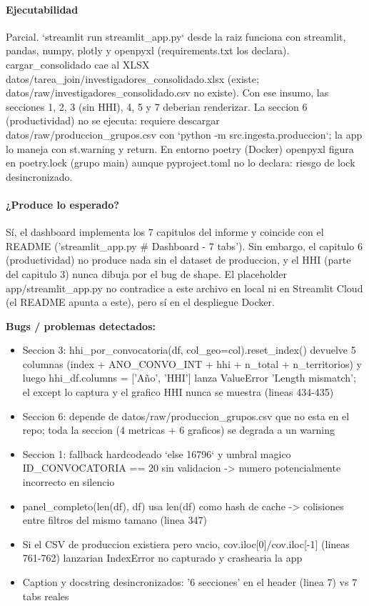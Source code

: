\paragraph{Ejecutabilidad}
Parcial. `streamlit run streamlit\_app.py` desde la raiz funciona con streamlit, pandas, numpy, plotly y openpyxl (requirements.txt los declara). cargar\_consolidado cae al XLSX datos/tarea\_join/investigadores\_consolidado.xlsx (existe; datos/raw/investigadores\_consolidado.csv no existe). Con ese insumo, las secciones 1, 2, 3 (sin HHI), 4, 5 y 7 deberian renderizar. La seccion 6 (productividad) no se ejecuta: requiere descargar datos/raw/produccion\_grupos.csv con `python -m src.ingesta.produccion`; la app lo maneja con st.warning y return. En entorno poetry (Docker) openpyxl figura en poetry.lock (grupo main) aunque pyproject.toml no lo declara: riesgo de lock desincronizado.

\paragraph{¿Produce lo esperado?}
Sí, el dashboard implementa los 7 capitulos del informe y coincide con el README ('streamlit\_app.py \# Dashboard - 7 tabs'). Sin embargo, el capitulo 6 (productividad) no produce nada sin el dataset de produccion, y el HHI (parte del capitulo 3) nunca dibuja por el bug de shape. El placeholder app/streamlit\_app.py no contradice a este archivo en local ni en Streamlit Cloud (el README apunta a este), pero sí en el despliegue Docker.

\begin{tcolorbox}[riesgo]
\textbf{Bugs / problemas detectados:}
\begin{itemize}
  \item Seccion 3: hhi\_por\_convocatoria(df, col\_geo=col).reset\_index() devuelve 5 columnas (index + ANO\_CONVO\_INT + hhi + n\_total + n\_territorios) y luego hhi\_df.columns = ['Año', 'HHI'] lanza ValueError 'Length mismatch'; el except lo captura y el grafico HHI nunca se muestra (lineas 434-435)
  \item Seccion 6: depende de datos/raw/produccion\_grupos.csv que no esta en el repo; toda la seccion (4 metricas + 6 graficos) se degrada a un warning
  \item Seccion 1: fallback hardcodeado `else 16796` y umbral magico ID\_CONVOCATORIA == 20 sin validacion -> numero potencialmente incorrecto en silencio
  \item panel\_completo(len(df), df) usa len(df) como hash de cache -> colisiones entre filtros del mismo tamano (linea 347)
  \item Si el CSV de produccion existiera pero vacio, cov.iloc[0]/cov.iloc[-1] (lineas 761-762) lanzarian IndexError no capturado y crashearia la app
  \item Caption y docstring desincronizados: '6 secciones' en el header (linea 7) vs 7 tabs reales
\end{itemize}
\end{tcolorbox}

